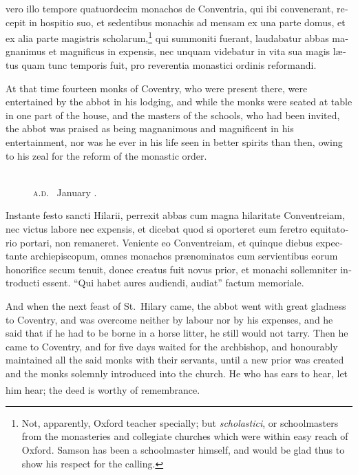 \documentclass[10pt]{book}
\newcounter{engnote}
\newcommand{\engnotenum}{\textsuperscript{\arabic{engnote}\stepcounter{engnote}}}
\newcommand{\engnotetext}[1]{\vphantom{\footnotemark{}}\footnotetext{#1}}
\newcommand{\blockhead}[4][]{
\begin{figure}
\centering
\vspace{#4}
\parbox{2.75cm}{\begin{center}\footnotesize \color{BrickRed} \emph{#2}\\ #1 \end{center}}
\end{figure}
}
\begin{document}
\begin{paracol}{2}
\switchcolumn*

\begin{otherlanguage}{latin}
vero illo tempore quatuordecim monachos de Conventria, qui ibi convenerant, recepit in hospitio suo, et sedentibus monachis ad mensam ex una parte domus, et ex alia parte magistris scholarum,\footnote[\textdagger]{Not, apparently, Oxford teacher specially; but \emph{scholastici}, or schoolmasters from the monasteries and collegiate churches which were within easy reach of Oxford. Samson has been a schoolmaster himself, and would be glad thus to show his respect for the calling.} qui summoniti fuerant, laudabatur abbas magnanimus et magnificus in expensis, nec unquam videbatur in vita sua magis l\ae{}tus quam tunc temporis fuit, pro reverentia monastici ordinis reformandi. 
\end{otherlanguage}

\switchcolumn

At that time fourteen monks of Coventry, who were present there, were entertained by the abbot in his lodging, and while the monks were seated at table in one part of the house, and the masters of the schools, who had been invited, the abbot was praised as being magnanimous and magnificent in his entertainment, nor was he ever in his life seen in better spirits than then, owing to his zeal for the reform of the monastic order.

\switchcolumn*

\begin{otherlanguage}{latin}
\blockhead[\textsc{a.d}.\  January \oldstylenums{13}.]{}{2}{-.7cm} 
Instante festo sancti Hilarii, perrexit abbas cum magna hilaritate Conventreiam, nec victus labore nec expensis, et dicebat quod si oporteret eum feretro equitatorio portari, non remaneret. Veniente eo Conventreiam, et quinque diebus expectante archiepiscopum, omnes monachos pr\ae{}nominatos cum servientibus eorum honorifice secum tenuit, donec creatus fuit novus prior, et monachi sollemniter introducti essent. ``Qui habet aures audiendi, audiat''\engnotetext{Matt.\ xi., \oldstylenums{15}.} factum memoriale.

\end{otherlanguage}

\switchcolumn

And when the next feast of St.\ Hilary came, the abbot went with great gladness to Coventry, and was overcome neither by labour nor by his expenses, and he said that if he  had to be borne in a horse litter, he still would not tarry. Then he came to Coventry, and for five days waited for the archbishop, and honourably maintained all the said monks with their servants, until a new prior was created and the  monks solemnly introduced into the church. He who has ears to hear, let him hear;\engnotenum{} the deed is worthy of remembrance.


\end{paracol}
\end{document}

